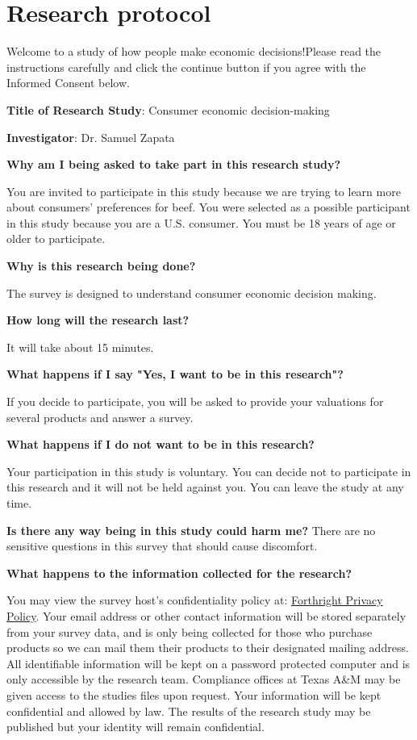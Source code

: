 \documentclass[12pt]{article}
\begin{document}
        
\section{Research protocol}

Welcome to a study of how people make economic decisions!Please read the instructions carefully and click the continue button if you agree with the Informed Consent below.

\textbf{Title of Research Study}: Consumer economic decision-making

\textbf{Investigator}: Dr. Samuel Zapata

\textbf{Why am I being asked to take part in this research study?}

You are invited to participate in this study because we are trying to learn more about consumers' preferences for beef. You were selected as a possible participant in this study because you are a U.S. consumer. You must be 18 years of age or older to participate. \par
\textbf{Why is this research being done?} \par

The survey is designed to understand consumer economic decision making. \par

\textbf{How long will the research last?} \par
It will take about 15 minutes. \par
\textbf{What happens if I say "Yes, I want to be in this research"?} \par
If you decide to participate, you will be asked to provide your valuations for several products and answer a survey. \par


\textbf{
What happens if I do not want to be in this research?} \par
Your participation in this study is voluntary. You can decide not to participate in this research and it will not be held against you. You can leave the study at any time. \par

\textbf{Is there any way being in this study could harm me?}
There are no sensitive questions in this survey that should cause discomfort. \par

\textbf{What happens to the information collected for the research?} \par
You may view the survey host’s confidentiality policy at: \href{https://www.beforthright.com/privacy}{Forthright Privacy Policy}. Your email address or other contact information will be stored separately from your survey data, and is only being collected for those who purchase products so we can mail them their products to their designated mailing address. All identifiable information will be kept on a password protected computer and is only accessible by the research team. Compliance offices at Texas A\&M may be given access to the studies files upon request. Your information will be kept confidential and allowed by law. The results of the research study may be published but your identity will remain confidential. \par
\end{document}
